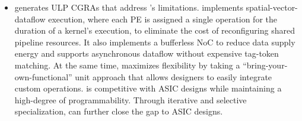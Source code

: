 \begin{itemize}
% 
% 
% 
% 
% 
% 
% 
\item \snafu generates ULP CGRAs that address \manic's limitations.
% 
\snafu implements spatial-vector-dataflow execution, where each PE is assigned a single operation for the duration of a kernel's execution, to eliminate the cost of reconfiguring shared pipeline resources.
% 
% 
It also implements a bufferless NoC to reduce data supply energy and supports asynchronous dataflow without expensive tag-token matching.
% 
% 
At the same time, \snafu maximizes flexibility by taking a ``bring-your-own-functional'' unit approach that allows designers to easily integrate custom operations.
% 
\snafu is competitive with ASIC designs while maintaining a high-degree of programmability.
% 
Through iterative and selective specialization, \snafu can further close the gap to ASIC designs.


\end{itemize}
